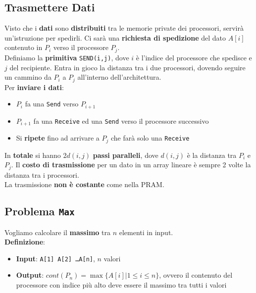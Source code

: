 \newpage

\subsection{Trasmettere Dati}

Visto che i \textbf{dati} sono \textbf{distribuiti} tra le memorie private dei processori, servirà un'istruzione per spedirli. Ci sarà una \textbf{richiesta di spedizione} del dato $A[i]$ contenuto in $P_i$ verso il processore $P_j$. \\

Definiamo la \textbf{primitiva} \texttt{SEND(i,j)}, dove $i$ è l'indice del processore che spedisce e $j$ del recipiente. Entra in gioco la distanza tra i due processori, dovendo seguire un cammino da $P_i$ a $P_j$ all'interno dell'architettura.\\

Per \textbf{inviare i dati}: 
\begin{itemize}
	\item $P_i$ fa una \texttt{Send} verso $P_{i+1}$
	\item $P_{i+1}$ fa una \texttt{Receive} ed una \texttt{Send} verso il processore successivo
	\item Si \textbf{ripete} fino ad arrivare a $P_j$ che farà solo una \texttt{Receive}
\end{itemize}

In \textbf{totale} si hanno $2 d(i,j)$ \textbf{passi paralleli}, dove $d(i,j)$ è la distanza tra $P_i$ e $P_j$. Il \textbf{costo di trasmissione} per un dato in un array lineare è sempre 2 volte la distanza tra i processori.\\

La trasmissione \textbf{non è costante} come nella PRAM.\\

\newpage

\subsection{Problema \texttt{Max}}
Vogliamo calcolare il \textbf{massimo} tra $n$ elementi in input.\\

\textbf{Definizione}: 
\begin{itemize}
	\item \textbf{Input}: \texttt{A[1] A[2] \dots A[n]}, $n$ valori
	\item \textbf{Output}: $cont(P_n) = \max\{A[i] | 1 \leq i \leq n\}$, ovvero il contenuto del processore con indice più alto deve essere il massimo tra tutti i valori
\end{itemize}

